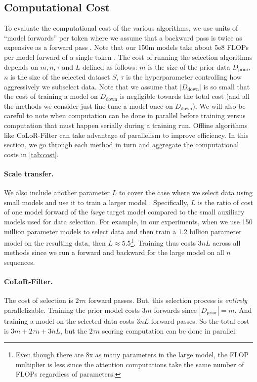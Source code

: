 \documentclass{article}
\newcommand{\Dprior}{D_{\text{prior}}}
\newcommand{\Ddown}{D_{\text{down}}}
\begin{document}
\subsection{Computational Cost}\label{sec:compute}

To evaluate the computational cost of the various algorithms, we use units of ``model forwards'' per token where we assume that a backward pass is twice as expensive as a forward pass \citep{fleuret2023little}. Note that our 150m models take about 5e8 FLOPs per model forward of a single token \citep{hoffmann2022training, casson2023transformerflops}.
The cost of running the selection algorithms depends on $m, n, \tau$ and $ L$ defined as follows: 
$ m $ is the size of the prior data $ \Dprior$, $n $ is the size of the selected dataset $ S$, $ \tau$ is the hyperparameter controlling how aggressively we subselect data. 
Note that we assume that $ |\Ddown|$ is so small that the cost of training a model on $ \Ddown$ is negligible towards the total cost (and all the methods we consider just fine-tune a model once on $ \Ddown$). We will also be careful to note when computation can be done in parallel before training versus computation that must happen serially during a training run. Offline algorithms like CoLoR-Filter can take advantage of parallelism to improve efficiency. In this section, we go through each method in turn and aggregate the computational costs in \cref{tab:cost}.

\paragraph{Scale transfer.}
We also include another parameter $ L $ to cover the case where we select data using small models and use it to train a larger model \citep{evans2023bad}.
Specifically, $ L$ is the ratio of cost of one model forward of the \emph{large} target model compared to the small auxiliary models used for data selection.
For example, in our experiments, when we use 150 million parameter models to select data and then train a 1.2 billion parameter model on the resulting data, then $ L\approx 5.5$\footnote{Even though there are 8x as many parameters in the large model, the FLOP multiplier is less since the attention computations take the same number of FLOPs regardless of parameters.}. Training thus costs $ 3nL$ across all methods since we run a forward and backward for the large model on all $ n $ sequences.
  

\paragraph{CoLoR-Filter.} The cost of selection is $ 2\tau n$ forward passes. But, this selection process is \emph{entirely} parallelizable. Training the prior model costs $ 3m $ forwards since $ |\Dprior| = m$. And training a model on the selected data costs $ 3nL $ forward passes. So the total cost is $3m + 2 \tau n + 3nL$, but the $ 2 \tau n$ scoring computation can be done in parallel. 
\end{document}
